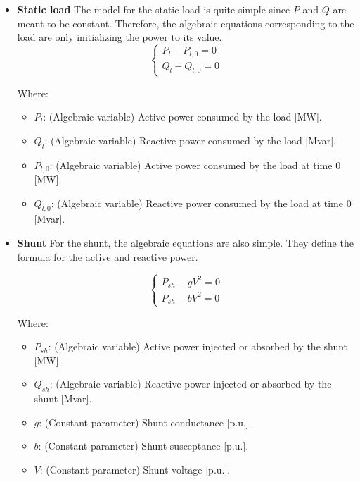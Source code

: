 \begin{itemize}
\item \textbf{Static load}
The model for the static load is quite simple since $P$ and $Q$ are meant to be constant. Therefore, the algebraic equations
corresponding to the load are only initializing the power to its value.
\begin{equation}
\begin{cases}
P_l -P_{l,0} = 0\\
Q_l -Q_{l,0} = 0
\end{cases}
\label{eq:alg_eq_load}
\end{equation}

Where:
\begin{itemize}
  \item $P_l$: (Algebraic variable) Active power consumed by the load [MW].
  \item $Q_l$: (Algebraic variable) Reactive power consumed by the load [Mvar].
  \item $P_{l,0}$: (Algebraic variable) Active power consumed by the load at time 0 [MW].
  \item $Q_{l,0}$: (Algebraic variable) Reactive power consumed by the load at time 0 [Mvar].
\end{itemize}

\item  \textbf{Shunt}
For the shunt, the algebraic equations are also simple. They define the formula for the active and reactive power.

\begin{equation}
\begin{cases}
P_{sh} - g V^2 = 0 \\
P_{sh} - b V^2 = 0
\end{cases}
\label{eq:alg_eq_shunt}
\end{equation}

Where:
\begin{itemize}
  \item $P_{sh}$: (Algebraic variable) Active power injected or absorbed by the shunt [MW].
  \item $Q_{sh}$: (Algebraic variable) Reactive power injected or absorbed by the shunt [Mvar].
  \item $g$: (Constant parameter) Shunt conductance [p.u.].
  \item $b$: (Constant parameter) Shunt susceptance [p.u.].
  \item $V$: (Constant parameter) Shunt voltage [p.u.].
\end{itemize}


\end{itemize}
